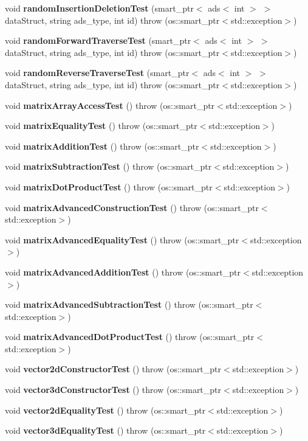 \begin{DoxyCompactItemize}
\item 
void {\bf random\+Insertion\+Deletion\+Test} (smart\+\_\+ptr$<$ ads$<$ int $>$ $>$ data\+Struct, string ads\+\_\+type, int id)  throw (os\+::smart\+\_\+ptr$<$std\+::exception$>$)
\item 
void {\bf random\+Forward\+Traverse\+Test} (smart\+\_\+ptr$<$ ads$<$ int $>$ $>$ data\+Struct, string ads\+\_\+type, int id)  throw (os\+::smart\+\_\+ptr$<$std\+::exception$>$)
\item 
void {\bf random\+Reverse\+Traverse\+Test} (smart\+\_\+ptr$<$ ads$<$ int $>$ $>$ data\+Struct, string ads\+\_\+type, int id)  throw (os\+::smart\+\_\+ptr$<$std\+::exception$>$)
\item 
void {\bf matrix\+Array\+Access\+Test} ()  throw (os\+::smart\+\_\+ptr$<$std\+::exception$>$)
\item 
void {\bf matrix\+Equality\+Test} ()  throw (os\+::smart\+\_\+ptr$<$std\+::exception$>$)
\item 
void {\bf matrix\+Addition\+Test} ()  throw (os\+::smart\+\_\+ptr$<$std\+::exception$>$)
\item 
void {\bf matrix\+Subtraction\+Test} ()  throw (os\+::smart\+\_\+ptr$<$std\+::exception$>$)
\item 
void {\bf matrix\+Dot\+Product\+Test} ()  throw (os\+::smart\+\_\+ptr$<$std\+::exception$>$)
\item 
void {\bf matrix\+Advanced\+Construction\+Test} ()  throw (os\+::smart\+\_\+ptr$<$std\+::exception$>$)
\item 
void {\bf matrix\+Advanced\+Equality\+Test} ()  throw (os\+::smart\+\_\+ptr$<$std\+::exception$>$)
\item 
void {\bf matrix\+Advanced\+Addition\+Test} ()  throw (os\+::smart\+\_\+ptr$<$std\+::exception$>$)
\item 
void {\bf matrix\+Advanced\+Subtraction\+Test} ()  throw (os\+::smart\+\_\+ptr$<$std\+::exception$>$)
\item 
void {\bf matrix\+Advanced\+Dot\+Product\+Test} ()  throw (os\+::smart\+\_\+ptr$<$std\+::exception$>$)
\item 
void {\bf vector2d\+Constructor\+Test} ()  throw (os\+::smart\+\_\+ptr$<$std\+::exception$>$)
\item 
void {\bf vector3d\+Constructor\+Test} ()  throw (os\+::smart\+\_\+ptr$<$std\+::exception$>$)
\item 
void {\bf vector2d\+Equality\+Test} ()  throw (os\+::smart\+\_\+ptr$<$std\+::exception$>$)
\item 
void {\bf vector3d\+Equality\+Test} ()  throw (os\+::smart\+\_\+ptr$<$std\+::exception$>$)

\end{DoxyCompactItemize}

